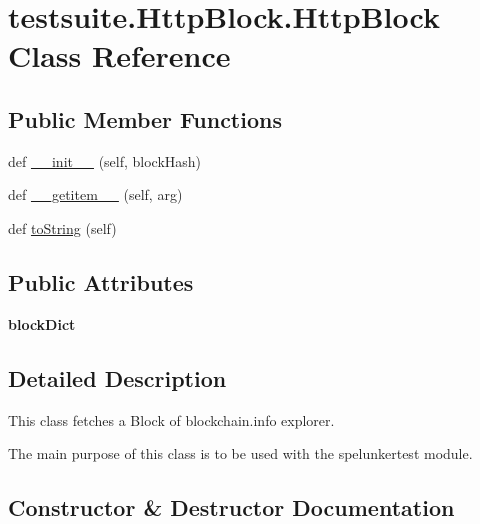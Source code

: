 \hypertarget{classtestsuite_1_1HttpBlock_1_1HttpBlock}{}\section{testsuite.\+Http\+Block.\+Http\+Block Class Reference}
\label{classtestsuite_1_1HttpBlock_1_1HttpBlock}
\subsection*{Public Member Functions}
\begin{DoxyCompactItemize}
\item 
def \hyperlink{classtestsuite_1_1HttpBlock_1_1HttpBlock_ae8f0e7ff823cf0a9e2504b51180b87ef}{\+\_\+\+\_\+init\+\_\+\+\_\+} (self, block\+Hash)
\item 
def \hyperlink{classtestsuite_1_1HttpBlock_1_1HttpBlock_affbff0a2e93d29866d6e50ca683bb9e7}{\+\_\+\+\_\+getitem\+\_\+\+\_\+} (self, arg)
\item 
def \hyperlink{classtestsuite_1_1HttpBlock_1_1HttpBlock_a743227a0e4b4f80b8eebf770e3dcb435}{to\+String} (self)
\end{DoxyCompactItemize}
\subsection*{Public Attributes}
\begin{DoxyCompactItemize}
\item 
\hypertarget{classtestsuite_1_1HttpBlock_1_1HttpBlock_af1b8ba6be860690374cde01f3e35b018}{}{\bfseries block\+Dict}\label{classtestsuite_1_1HttpBlock_1_1HttpBlock_af1b8ba6be860690374cde01f3e35b018}

\end{DoxyCompactItemize}


\subsection{Detailed Description}
\begin{DoxyVerb}This class fetches a Block of blockchain.info explorer.

The main purpose of this class is to be used with the spelunkertest module.
\end{DoxyVerb}
 

\subsection{Constructor \& Destructor Documentation}
\hypertarget{classtestsuite_1_1HttpBlock_1_1HttpBlock_ae8f0e7ff823cf0a9e2504b51180b87ef}{}
